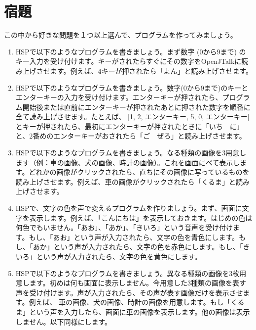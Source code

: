\documentclass[text06.tex]{subfiles}
\begin{document}
\newpage
\section{宿題}
この中から好きな問題を１つ以上選んで、プログラムを作ってみましょう。
\begin{enumerate}
\item HSPで以下のようなプログラムを書きましょう。まず数字 (0から9まで) のキー入力を受け付けます。キーがされたらすぐにその数字をOpenJTalkに読み上げさせます。例えば、4キーが押されたら「よん」と読み上げさせます。
\item HSPで以下のようなプログラムを書きましょう。数字(0から9まで)のキーとエンターキーの入力を受け付けます。エンターキーが押されたら、プログラム開始後または直前にエンターキーが押されたあとに押された数字を順番に全て読み上げさせます。たとえば、 [1, 2, エンターキー, 5, 0, エンターキー]とキーが押されたら、最初にエンターキーが押されたときに「いち　に」と、2番めのエンターキーがおされたら「ご　ぜろ」と読み上げさせます。
\item HSPで以下のようなプログラムを書きましょう。なる種類の画像を3用意します（例：車の画像、犬の画像、時計の画像）。これを画面にべて表示します。どれかの画像がクリックされたら、直ちにその画像に写っているものを読み上げさせます。例えば、車の画像がクリックされたら「くるま」と読み上げさせます。
\item HSPで、文字の色を声で変えるプログラムを作りましょう。まず、画面に文字を表示します。例えば、「こんにちは」を表示しておきます。はじめの色は何色でもいません。「あお」、「あか」、「きいろ」という音声を受け付けます。もし、「あお」という声が入力されたら、文字の色を青色にします。もし、「あか」という声が入力されたら、文字の色を赤色にします。もし、「きいろ」という声が入力されたら、文字の色を黄色にします。
\item HSPで以下のようなプログラムを書きましょう。異なる種類の画像を3枚用意します。初めは何も画面に表示しません。今用意した3種類の画像を表す声を受け付けます。声が入力されたら、その声が表す画像だけを表示させます。例えば、 車の画像、犬の画像、時計の画像を用意します。もし「くるま」という声を入力したら、画面に車の画像を表示します。他の画像は表示しません。以下同様にします。
\end{enumerate}
\end{document}
